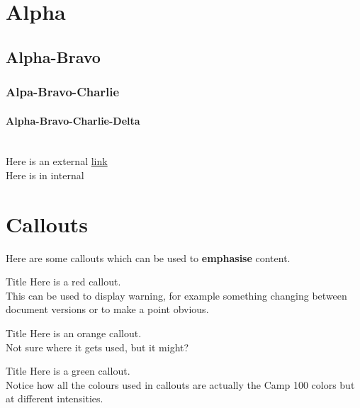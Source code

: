\documentclass[a4paper, 11pt]{report}
\begin{document}
\makedocumenttitlepage

\tableofcontents

\chapter{Alpha}
\lipsum[1]
\section{Alpha-Bravo}
\subsection{Alpa-Bravo-Charlie}
\subsubsection{Alpha-Bravo-Charlie-Delta}
\lipsum[1-3]\\

Here is an external \href{https://camp100.org.uk}{link}\\

Here is in internal 

\chapter{Callouts}
Here are some callouts which can be used to \textbf{emphasise} content.

\begin{callout-red}{Title}
Here is a red callout.\\

This can be used to display warning, for example something changing between document versions or to make a point obvious.
\end{callout-red}

\begin{callout-orange}{Title}
Here is an orange callout.\\

Not sure where it gets used, but it might?
\end{callout-orange}

\begin{callout-green}{Title}
Here is a green callout.\\

Notice how all the colours used in callouts are actually the Camp 100 colors but at different intensities. 
\end{callout-green}
\end{document}
